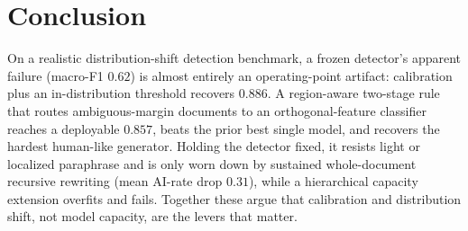 \documentclass[11pt]{article}
\begin{document}
\section{Conclusion}

On a realistic distribution-shift detection benchmark, a frozen detector's
apparent failure (macro-F1 $0.62$) is almost entirely an operating-point
artifact: calibration plus an in-distribution threshold recovers $0.886$.
A region-aware two-stage rule that routes ambiguous-margin documents to an
orthogonal-feature classifier reaches a deployable $0.857$, beats the prior
best single model, and recovers the hardest human-like generator. Holding the
detector fixed, it resists light or localized paraphrase and is only worn down
by sustained whole-document recursive rewriting (mean AI-rate drop $0.31$),
while a hierarchical capacity extension overfits and fails.
Together these argue that calibration and distribution shift, not model
capacity, are the levers that matter.



\end{document}
